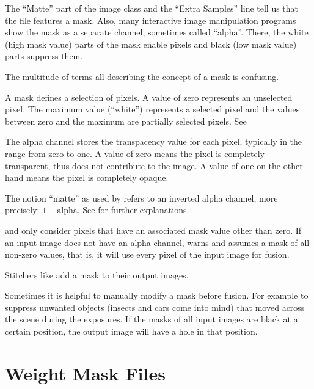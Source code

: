 %
%
%
The ``Matte'' part of the image class and the ``Extra Samples'' line tell us that the file
features a mask.  Also, many interactive image manipulation programs show the mask as a separate
channel, sometimes called ``alpha''.  There, the white (high mask value) parts of the mask
enable pixels and black (low mask value) parts suppress them.

The multitude of terms all describing the concept of a mask is confusing.

\begin{description}
\item[Mask]\itemend
  A mask defines a selection of pixels.  A value of zero represents an unselected pixel.  The
  maximum value (``white'') represents a selected pixel and the values between zero and the
  maximum are partially selected pixels.  See 

\item[Alpha Channel]\itemend
  The alpha channel stores the transpacency value for each pixel, typically in the range from
  zero to one.  A value of zero means the pixel is completely transparent, thus does not
  contribute to the image.  A value of one on the other hand means the pixel is completely
  opaque.

\item[Matte]\itemend
  The notion ``matte'' as used by  refers to an inverted alpha channel,
  more precisely: $1 - \mbox{alpha}$.  See
   for further explanations.
\end{description}

\App{} and \OtherApp{} only consider pixels that have an associated mask value other than zero.
If an input image does not have an alpha channel,  warns and assumes a mask
of all non-zero values, that is, it will use every pixel of the input image for fusion.

%
Stitchers like  add a mask to their output images.

Sometimes it is helpful to manually modify a mask before fusion.  For example to suppress
unwanted objects (insects and cars come into mind) that moved across the scene during the
exposures.  If the masks of all input images are black at a certain position, the output image
will have a hole in that position.


\section[Weight Mask Files]{\label{sec:weight-mask-files}%
  Weight Mask Files}




